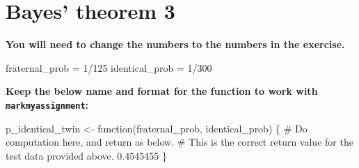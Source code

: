 \documentclass[
]{article}
\newenvironment{Shaded}{\begin{snugshade}}{\end{snugshade}}
\newcommand{\CommentTok}[1]{\textcolor[rgb]{0.37,0.37,0.37}{#1}}
\newcommand{\ControlFlowTok}[1]{\textcolor[rgb]{0.00,0.23,0.31}{#1}}
\newcommand{\DecValTok}[1]{\textcolor[rgb]{0.68,0.00,0.00}{#1}}
\newcommand{\FloatTok}[1]{\textcolor[rgb]{0.68,0.00,0.00}{#1}}
\newcommand{\NormalTok}[1]{\textcolor[rgb]{0.00,0.23,0.31}{#1}}
\newcommand{\OtherTok}[1]{\textcolor[rgb]{0.00,0.23,0.31}{#1}}
\newcommand{\SpecialCharTok}[1]{\textcolor[rgb]{0.37,0.37,0.37}{#1}}
\begin{document}
\hypertarget{bayes-theorem-3}{%
\section{Bayes' theorem 3}\label{bayes-theorem-3}}

\textbf{You will need to change the numbers to the numbers in the
exercise.}

\begin{Shaded}
\begin{Highlighting}[]
\NormalTok{fraternal\_prob }\OtherTok{=} \DecValTok{1}\SpecialCharTok{/}\DecValTok{125}
\NormalTok{identical\_prob }\OtherTok{=} \DecValTok{1}\SpecialCharTok{/}\DecValTok{300}
\end{Highlighting}
\end{Shaded}

\textbf{Keep the below name and format for the function to work with
\texttt{markmyassignment}:}

\begin{Shaded}
\begin{Highlighting}[]
\NormalTok{p\_identical\_twin }\OtherTok{\textless{}{-}} \ControlFlowTok{function}\NormalTok{(fraternal\_prob, identical\_prob) \{}
    \CommentTok{\# Do computation here, and return as below.}
    \CommentTok{\# This is the correct return value for the test data provided above.}
    \FloatTok{0.4545455}
\NormalTok{\}}
\end{Highlighting}
\end{Shaded}
\end{document}

